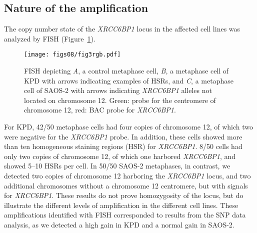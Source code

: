 \subsection{Nature of the amplification}
The copy number state of the {\it XRCC6BP1} locus in the affected cell lines was analyzed by FISH (Figure~\ref{fig8.3}).
%
\begin{figure}[htbp]
  \centering
  \begin{minipage}[b]{0.50\linewidth}
    \texttt{[image: figs08/fig3rgb.pdf]}		%
  \end{minipage}
    \hfill
  \begin{minipage}[b]{0.46\linewidth}
     \caption{FISH depicting {\it A}, a control metaphase cell, {\it B}, a metaphase cell of KPD with arrows indicating examples of HSRs, and {\it C}, a metaphase cell of SAOS-2 with arrows indicating {\it XRCC6BP1} alleles not located on chromosome 12. Green: probe for the centromere of chromosome 12, red: BAC probe for {\it XRCC6BP1}.}
     \label{fig8.3}
     \end{minipage}
\end{figure}
%
For KPD, 42/50 metaphase cells had four copies of chromosome 12, of which two were negative for the {\it XRCC6BP1} probe. In addition, these cells showed more than ten homogeneous staining regions (HSR) for {\it XRCC6BP1}. 8/50 cells had only two copies of chromosome 12, of which one harbored {\it XRCC6BP1}, and showed 5--10 HSRs per cell. In 50/50 SAOS-2 metaphases, in contrast, we detected two copies of chromosome 12 harboring the {\it XRCC6BP1} locus, and two additional chromosomes without a chromosome 12 centromere, but with signals for {\it XRCC6BP1}. These results do not prove homozygosity of the locus, but do illustrate the different levels of amplification in the different cell lines. These amplifications identified with FISH corresponded to results from the SNP data analysis, as we detected a high gain in KPD and a normal gain in SAOS-2.

